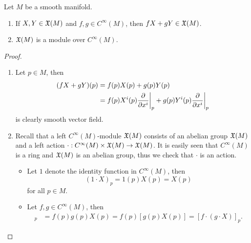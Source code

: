 \begin{proposition}
Let $M$ be a smooth manifold. 
\begin{enumerate}
    \item If $X,Y \in \mathfrak{X}(M)$ and $f,g \in C^\infty(M)$, then $fX+gY \in \mathfrak{X}(M)$. 
    \item $\mathfrak{X}(M)$ is a module over $C^\infty(M)$. 
\end{enumerate}
\end{proposition}
\begin{proof}
    \begin{enumerate}
    \item Let $p \in M$, then 
    \begin{align*}
    (fX+gY)(p) &= f(p)X(p) + g(p)Y(p) \\
    &= f(p)X^i(p)\pdv{}{x^i}\bigg|_{p} + g(p)Y^i(p)\pdv{}{x^i}\bigg|_{p}
    \end{align*}
    is clearly smooth vector field. 
    \item Recall that a left $C^\infty(M)$-module $\frak{X}(M)$ consists of an abelian group $\frak{X}(M)$ and a left action $\cdot: C^\infty(M) \times \frak{X}(M) \to \frak{X}(M)$. 
    It is easily seen that $C^\infty(M)$ is a ring and $\frak{X}(M)$ is an abelian group, thus we check that $\cdot$ is an action. 
    \begin{itemize}
    \item Let $1$ denote the identity function in $C^\infty(M)$, then $$(1 \cdot X)_p = 1(p)X(p) = X(p)$$ for all $p \in M$. 
    \item Let $f,g \in C^\infty(M)$, then 
    \begin{align*}
    [(fg)\cdot X]_p &= f(p)g(p)X(p)
    = f(p)[g(p)X(p)] = [f \cdot (g \cdot X)]_p.
    \end{align*}
    \end{itemize}
    \end{enumerate}
\end{proof}


